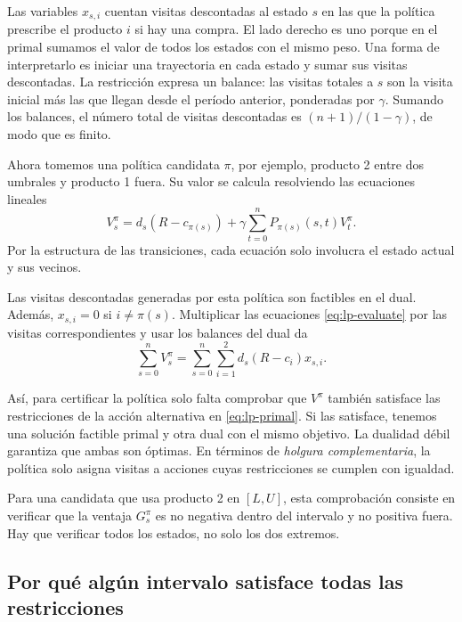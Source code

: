 \documentclass[11pt,a4paper]{article}
\begin{document}
Las variables $x_{s,i}$ cuentan visitas descontadas al estado $s$ en las
que la política prescribe el producto $i$ si hay una compra. El lado
derecho es uno porque en el primal
sumamos el valor de todos los estados con el mismo peso. Una forma de
interpretarlo es iniciar una trayectoria en cada estado y sumar sus
visitas descontadas. La restricción expresa un balance: las visitas
totales a $s$ son la visita inicial más las que llegan desde el período
anterior, ponderadas por $\gamma$. Sumando los balances, el número total
de visitas descontadas es $(n+1)/(1-\gamma)$, de modo que es finito.

Ahora tomemos una política candidata $\pi$, por ejemplo, producto 2
entre dos umbrales y producto 1 fuera. Su valor se calcula resolviendo
las ecuaciones lineales
\begin{equation}
V_s^\pi=d_s(R-c_{\pi(s)})
       +\gamma\sum_{t=0}^{n}P_{\pi(s)}(s,t)V_t^\pi.
\label{eq:lp-evaluate}
\end{equation}
Por la estructura de las transiciones, cada ecuación solo involucra
el estado actual y sus vecinos.

Las visitas descontadas generadas por esta política son factibles en
el dual. Además, $x_{s,i}=0$ si $i\ne\pi(s)$. Multiplicar las
ecuaciones \eqref{eq:lp-evaluate} por las visitas correspondientes y
usar los balances del dual da
\begin{equation}
\sum_{s=0}^{n}V_s^\pi
 =\sum_{s=0}^{n}\sum_{i=1}^{2}d_s(R-c_i)x_{s,i}.
\label{eq:lp-equal-objectives}
\end{equation}

Así, para certificar la política solo falta comprobar que $V^\pi$
también satisface las restricciones de la acción alternativa en
\eqref{eq:lp-primal}. Si las satisface, tenemos una solución factible
primal y otra dual con el mismo objetivo. La dualidad débil garantiza
que ambas son óptimas. En términos de \emph{holgura complementaria},
la política solo asigna visitas a acciones cuyas restricciones se
cumplen con igualdad.

Para una candidata que usa producto 2 en $[L,U]$, esta comprobación
consiste en verificar que la ventaja $G_s^\pi$ es no negativa dentro
del intervalo y no positiva fuera. Hay que verificar todos los
estados, no solo los dos extremos.

\subsection{Por qué algún intervalo satisface todas las restricciones}
\end{document}
